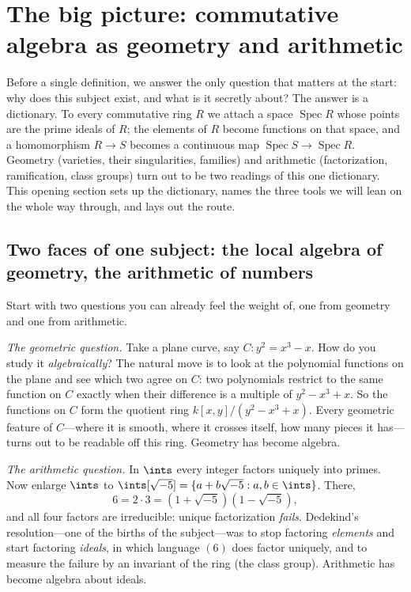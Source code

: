 \documentclass[11pt]{article}
\DeclareMathOperator{\Spec}{Spec}
\begin{document}
\newpage
\microtoc
\newpage

\section{The big picture: commutative algebra as geometry and arithmetic}

\noindent
Before a single definition, we answer the only question that matters at the start: why does
this subject exist, and what is it secretly about? The answer is a dictionary. To every
commutative ring $R$ we attach a space $\Spec R$ whose points are the prime ideals of $R$;
the elements of $R$ become functions on that space, and a homomorphism $R\to S$ becomes a
continuous map $\Spec S \to \Spec R$. Geometry (varieties, their singularities, families)
and arithmetic (factorization, ramification, class groups) turn out to be two readings of
this one dictionary. This opening section sets up the dictionary, names the three tools we
will lean on the whole way through, and lays out the route.

\subsection{Two faces of one subject: the local algebra of geometry, the arithmetic of numbers}

Start with two questions you can already feel the weight of, one from geometry and one from
arithmetic.

\emph{The geometric question.} Take a plane curve, say
$C\colon y^2 = x^3 - x$. How do you study it \emph{algebraically}? The natural move is to
look at the polynomial functions on the plane and see which two agree on $C$: two
polynomials restrict to the same function on $C$ exactly when their difference is a multiple
of $y^2 - x^3 + x$. So the functions on $C$ form the quotient ring
$k[x,y]/(y^2-x^3+x)$. Every geometric feature of $C$---where it is smooth, where it crosses
itself, how many pieces it has---turns out to be readable off this ring. Geometry has become
algebra.

\emph{The arithmetic question.} In $\ints$ every integer factors uniquely into primes. Now
enlarge $\ints$ to $\ints[\sqrt{-5}] = \{a + b\sqrt{-5} : a,b\in\ints\}$. There,
\[
6 = 2\cdot 3 = (1+\sqrt{-5})(1-\sqrt{-5}),
\]
and all four factors are irreducible: unique factorization \emph{fails}. Dedekind's
resolution---one of the births of the subject---was to stop factoring \emph{elements} and
start factoring \emph{ideals}, in which language $(6)$ does factor uniquely, and to measure
the failure by an invariant of the ring (the class group). Arithmetic has become algebra
about ideals.
\end{document}
